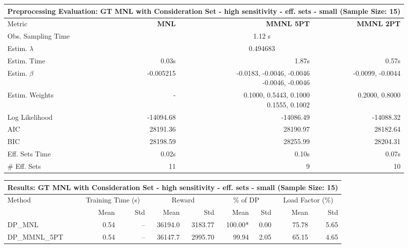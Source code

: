 
\begin{samepage}
\begin{center}
  \small
  \begin{tabular}{l|r|r|r}
    \toprule
    \multicolumn{4}{c}{\textbf{Preprocessing Evaluation: GT MNL with Consideration Set - high sensitivity - eff. sets - small (Sample Size: 15)}} \\
    \midrule
    Metric & \textbf{MNL} & \textbf{MMNL 5PT} & \textbf{MMNL 2PT} \\
    \midrule
    Obs. Sampling Time & \multicolumn{3}{c}{1.12 s} \\
    Estim. $\lambda$ & \multicolumn{3}{c}{0.494683} \\
    Estim. Time & 0.03s & 1.87s & 0.57s \\
    Estim. $\beta$ & -0.005215 & \makecell[tr]{-0.0183, -0.0046, -0.0046 \\ -0.0046, -0.0046} & -0.0099, -0.0044 \\
    Estim. Weights & - & \makecell[tr]{0.1000, 0.5443, 0.1000 \\ 0.1555, 0.1002} & 0.2000, 0.8000 \\
    Log Likelihood & -14094.68 & -14086.49 & -14088.32 \\
    AIC & 28191.36 & 28190.97 & 28182.64 \\
    BIC & 28198.59 & 28255.99 & 28204.31 \\
    Eff. Sets Time & 0.02s & 0.10s & 0.07s \\
    \# Eff. Sets & 11 & 9 & 10 \\
    \bottomrule
  \end{tabular}
\end{center}
\begin{center}
  \small
  \begin{tabular}{l|rr|rr|rr|rr}
    \toprule
    \multicolumn{9}{c}{\textbf{Results: GT MNL with Consideration Set - high sensitivity - eff. sets - small (Sample Size: 15)}} \\
    \midrule
    Method & \multicolumn{2}{c|}{Training Time (s)} & \multicolumn{2}{c|}{Reward} & \multicolumn{2}{c|}{\% of DP} & \multicolumn{2}{c}{Load Factor (\%)} \\
    & Mean & Std & Mean & Std & Mean & Std & Mean & Std \\
    \midrule
    DP\_MNL      &     0.54 &    -- &    36194.0 &    3183.77 & 100.00* &    0.00 &   75.78 &    5.65 \\
    DP\_MMNL\_5PT &     0.54 &    -- &    36147.7 &    2995.70 &   99.94 &    2.05 &   65.15 &    4.65 \\

\end{tabular}
\end{center}
\end{samepage}
